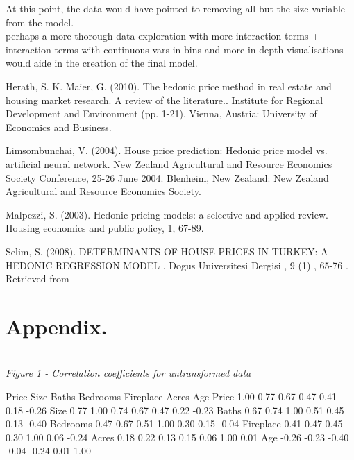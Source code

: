 \documentclass[10pt,A4,makeidx]{article}
\begin{document}
  At this point, the data would have pointed to removing all but the size variable from the model.\\
  
  perhaps a more thorough data exploration with more interaction terms + interaction terms with continuous vars in bins
  and more in depth visualisations would aide in the creation of the final model.


\begin{thebibliography}{9}
Herath, S. K. Maier, G. (2010). The hedonic price method in real estate and housing market research. A review of the literature.. Institute for Regional Development and Environment (pp. 1-21). Vienna, Austria: University of Economics and Business.

Limsombunchai, V. (2004). House price prediction: Hedonic price model vs. artificial neural network. New Zealand Agricultural and Resource Economics Society Conference, 25-26 June 2004. Blenheim, New Zealand: New Zealand Agricultural and Resource Economics Society.

Malpezzi, S. (2003). Hedonic pricing models: a selective and applied review. Housing economics and public policy, 1, 67-89.

Selim, S. (2008). DETERMINANTS OF HOUSE PRICES IN TURKEY: A HEDONIC REGRESSION MODEL . Dogus Universitesi Dergisi , 9 (1) , 65-76 . Retrieved from 
\end{thebibliography}

\pagebreak
\section*{Appendix.}
  \emph{\\Figure 1 - Correlation coefficients for untransformed data}
  \begin{Soutput}
              Price  Size Baths Bedrooms Fireplace Acres   Age
    Price      1.00  0.77  0.67     0.47      0.41  0.18 -0.26
    Size       0.77  1.00  0.74     0.67      0.47  0.22 -0.23
    Baths      0.67  0.74  1.00     0.51      0.45  0.13 -0.40
    Bedrooms   0.47  0.67  0.51     1.00      0.30  0.15 -0.04
    Fireplace  0.41  0.47  0.45     0.30      1.00  0.06 -0.24
    Acres      0.18  0.22  0.13     0.15      0.06  1.00  0.01
    Age       -0.26 -0.23 -0.40    -0.04     -0.24  0.01  1.00
  \end{Soutput}
  
\end{document}
